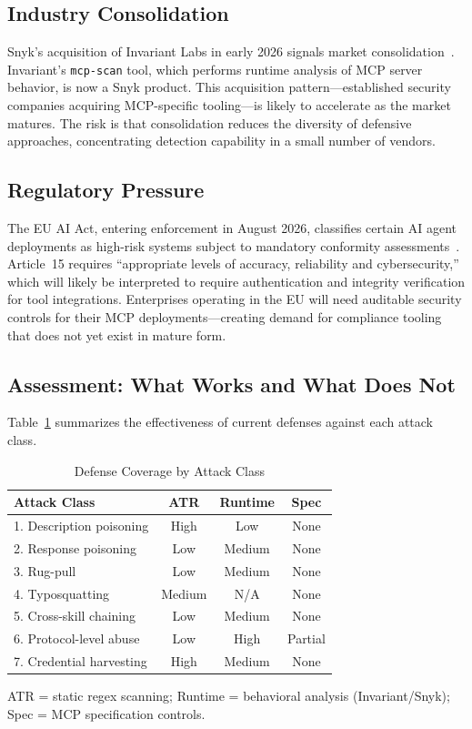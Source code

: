\documentclass[11pt,twocolumn]{article}
\begin{document}
\subsection{Industry Consolidation}

Snyk's acquisition of Invariant Labs in early 2026 signals market consolidation~\cite{snyk-invariant}. Invariant's \texttt{mcp-scan} tool, which performs runtime analysis of MCP server behavior, is now a Snyk product. This acquisition pattern---established security companies acquiring MCP-specific tooling---is likely to accelerate as the market matures. The risk is that consolidation reduces the diversity of defensive approaches, concentrating detection capability in a small number of vendors.

\subsection{Regulatory Pressure}

The EU AI Act, entering enforcement in August 2026, classifies certain AI agent deployments as high-risk systems subject to mandatory conformity assessments~\cite{eu-ai-act}. Article~15 requires ``appropriate levels of accuracy, reliability and cybersecurity,'' which will likely be interpreted to require authentication and integrity verification for tool integrations. Enterprises operating in the EU will need auditable security controls for their MCP deployments---creating demand for compliance tooling that does not yet exist in mature form.

\subsection{Assessment: What Works and What Does Not}

Table~\ref{tab:defense-assessment} summarizes the effectiveness of current defenses against each attack class.

\begin{table}[t]
\centering
\caption{Defense Coverage by Attack Class}
\label{tab:defense-assessment}
\begin{tabular}{@{}lccc@{}}
\toprule
\textbf{Attack Class} & \textbf{ATR} & \textbf{Runtime} & \textbf{Spec} \\
\midrule
1. Description poisoning & High & Low & None \\
2. Response poisoning & Low & Medium & None \\
3. Rug-pull & Low & Medium & None \\
4. Typosquatting & Medium & N/A & None \\
5. Cross-skill chaining & Low & Medium & None \\
6. Protocol-level abuse & Low & High & Partial \\
7. Credential harvesting & High & Medium & None \\
\bottomrule
\end{tabular}
\vspace{0.3em}

\footnotesize{ATR = static regex scanning; Runtime = behavioral analysis (Invariant/Snyk); Spec = MCP specification controls.}
\end{table}
\end{document}
